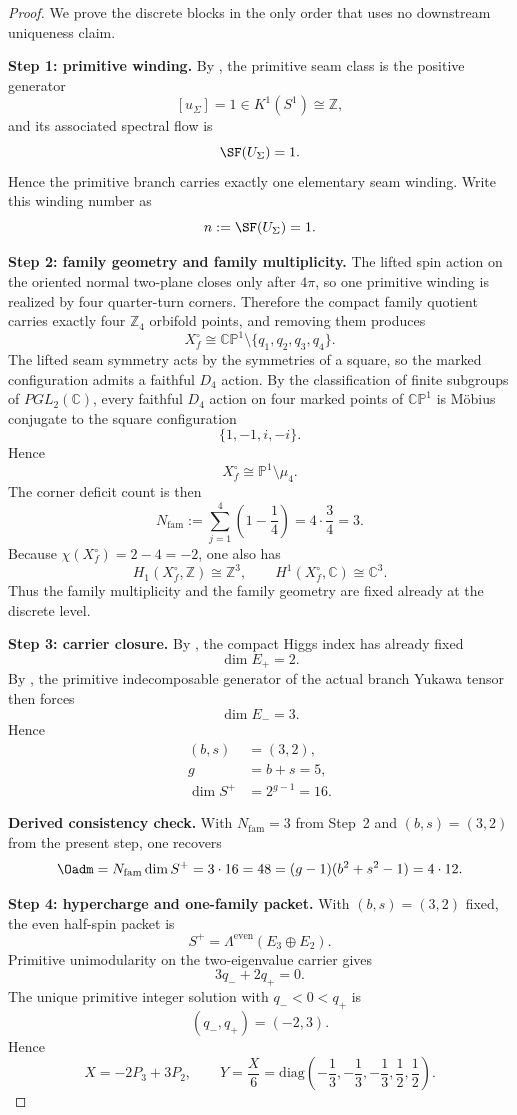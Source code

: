 \begin{proof}
We prove the discrete blocks in the only order that uses no downstream uniqueness claim.

\textbf{Step 1: primitive winding.}
By , the primitive seam class is the positive generator
\[
[u_\Sigma]=1\in K^1(S^1)\cong\mathbb Z,
\]
and its associated spectral flow is
\[
\SF(U_\Sigma)=1.
\]
Hence the primitive branch carries exactly one elementary seam winding. Write this winding number as
\[
n:=\SF(U_\Sigma)=1.
\]

\textbf{Step 2: family geometry and family multiplicity.}
The lifted spin action on the oriented normal two-plane closes only after $4\pi$, so one primitive
winding is realized by four quarter-turn corners. Therefore the compact family quotient carries
exactly four $\mathbb Z_4$ orbifold points, and removing them produces
\[
X_f^\circ\cong\mathbb{CP}^1\setminus\{q_1,q_2,q_3,q_4\}.
\]
The lifted seam symmetry acts by the symmetries of a square, so the marked configuration admits a
faithful $D_4$ action. By the classification of finite subgroups of $PGL_2(\mathbb C)$, every
faithful $D_4$ action on four marked points of $\mathbb{CP}^1$ is M\"obius conjugate to the square
configuration
\[
\{1,-1,i,-i\}.
\]
Hence
\[
X_f^\circ\cong\mathbb P^1\setminus\mu_4.
\]
The corner deficit count is then
\[
N_{\mathrm{fam}}
:=
\sum_{j=1}^{4}\left(1-\frac14\right)
=
4\cdot\frac34
=
3.
\]
Because $\chi(X_f^\circ)=2-4=-2$, one also has
\[
H_1(X_f^\circ,\mathbb Z)\cong\mathbb Z^3,
\qquad
H^1(X_f^\circ,\mathbb C)\cong\mathbb C^3.
\]
Thus the family multiplicity and the family geometry are fixed already at the discrete level.

\textbf{Step 3: carrier closure.}
By , the compact Higgs index has already fixed
\[
\dim E_+=2.
\]
By , the primitive indecomposable generator of the actual branch Yukawa tensor
then forces
\[
\dim E_-=3.
\]
Hence
\[
\begin{aligned}
(b,s)&=(3,2),\\
g&=b+s=5,\\
\dim S^+&=2^{g-1}=16.
\end{aligned}
\]

\textbf{Derived consistency check.}
With $N_{\mathrm{fam}}=3$ from Step~2 and $(b,s)=(3,2)$ from the present step, one recovers
\[
\Oadm
=
N_{\mathrm{fam}}\dim S^+
=
3\cdot 16
=
48
=
(g-1)(b^2+s^2-1)
=
4\cdot 12.
\]

\textbf{Step 4: hypercharge and one-family packet.}
With $(b,s)=(3,2)$ fixed, the even half-spin packet is
\[
S^+=\Lambda^{\mathrm{even}}(E_3\oplus E_2).
\]
Primitive unimodularity on the two-eigenvalue carrier gives
\[
3q_-+2q_+=0.
\]
The unique primitive integer solution with $q_-<0<q_+$ is
\[
(q_-,q_+)=(-2,3).
\]
Hence
\[
X=-2P_3+3P_2,
\qquad
Y=\frac{X}{6}
=
\mathrm{diag}\!\left(-\frac13,-\frac13,-\frac13,\frac12,\frac12\right).
\]


\end{proof}
